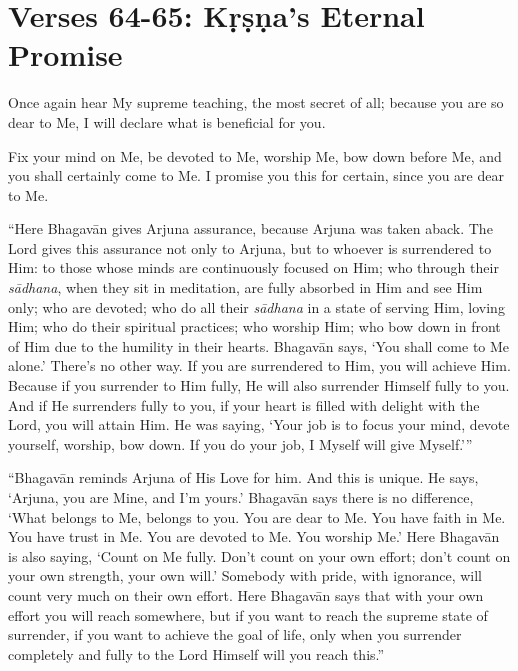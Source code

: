 \newpage

\section{Verses 64-65: Kṛṣṇa's Eternal Promise}\label{sec-verses-64-65-krsna-s-eternal-promise}

{Once again hear My supreme teaching, the most secret of all; because you are so dear to Me, I will declare what is beneficial for you.}

{Fix your mind on Me, be devoted to Me, worship Me, bow down before Me, and you shall certainly come to Me. I promise you this for certain, since you are dear to Me.}

\enquote{Here Bhagavān gives Arjuna assurance, because Arjuna was taken aback. The Lord gives this assurance not only to Arjuna, but to whoever is surrendered to Him: to those whose minds are continuously focused on Him; who through their \textit{sādhana}, when they sit in meditation, are fully absorbed in Him and see Him only; who are devoted; who do all their \textit{sādhana} in a state of serving Him, loving Him; who do their spiritual practices; who worship Him; who bow down in front of Him due to the humility in their hearts. Bhagavān says, \enquote{You shall come to Me alone.} There’s no other way. If you are surrendered to Him, you will achieve Him. Because if you surrender to Him fully, He will also surrender Himself fully to you. And if He surrenders fully to you, if your heart is filled with delight with the Lord, you will attain Him. He was saying, \enquote{Your job is to focus your mind, devote yourself, worship, bow down. If you do your job, I Myself will give Myself.}}

\enquote{Bhagavān reminds Arjuna of His Love for him. And this is unique. He says, \enquote{Arjuna, you are Mine, and I’m yours.} Bhagavān says there is no difference, \enquote{What belongs to Me, belongs to you. You are dear to Me. You have faith in Me. You have trust in Me. You are devoted to Me. You worship Me.} Here Bhagavān is also saying, \enquote{Count on Me fully. Don’t count on your own effort; don’t count on your own strength, your own will.} Somebody with pride, with ignorance, will count very much on their own effort. Here Bhagavān says that with your own effort you will reach somewhere, but if you want to reach the supreme state of surrender, if you want to achieve the goal of life, only when you surrender completely and fully to the Lord Himself will you reach this.}

